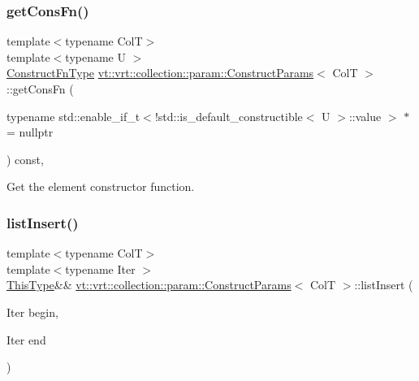 \subsubsection{\texorpdfstring{get\+Cons\+Fn()}{getConsFn()}\hspace{0.1cm}{\footnotesize\ttfamily [2/2]}}
{\footnotesize\ttfamily template$<$typename ColT$>$ \\
template$<$typename U $>$ \\
\hyperlink{structvt_1_1vrt_1_1collection_1_1param_1_1_construct_params_a7ad7bdf4220701e54b485f45e08b1736}{Construct\+Fn\+Type} \hyperlink{structvt_1_1vrt_1_1collection_1_1param_1_1_construct_params}{vt\+::vrt\+::collection\+::param\+::\+Construct\+Params}$<$ ColT $>$\+::get\+Cons\+Fn (\begin{DoxyParamCaption}\item[{typename std\+::enable\+\_\+if\+\_\+t$<$!std\+::is\+\_\+default\+\_\+constructible$<$ U $>$\+::value $>$ $\ast$}]{ = {\ttfamily nullptr} }\end{DoxyParamCaption}) const\hspace{0.3cm}{\ttfamily [inline]}, {\ttfamily [private]}}



Get the element constructor function. 

\mbox{\label{structvt_1_1vrt_1_1collection_1_1param_1_1_construct_params_a3338b667df3ff4cb3977d90e7cb09470}} 
\subsubsection{\texorpdfstring{list\+Insert()}{listInsert()}\hspace{0.1cm}{\footnotesize\ttfamily [1/2]}}
{\footnotesize\ttfamily template$<$typename ColT$>$ \\
template$<$typename Iter $>$ \\
\hyperlink{structvt_1_1vrt_1_1collection_1_1param_1_1_construct_params_a13d4910c0f6825c7b0ddfebce5288bea}{This\+Type}\&\& \hyperlink{structvt_1_1vrt_1_1collection_1_1param_1_1_construct_params}{vt\+::vrt\+::collection\+::param\+::\+Construct\+Params}$<$ ColT $>$\+::list\+Insert (\begin{DoxyParamCaption}\item[{Iter}]{begin,  }\item[{Iter}]{end }\end{DoxyParamCaption})\hspace{0.3cm}{\ttfamily [inline]}}



